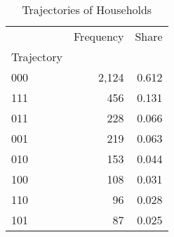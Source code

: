 \begin{table}
\centering
\caption{Trajectories of Households}
\label{tbl:trajectories}
\begin{tabular}{lrr}
\toprule
 & Frequency & Share \\
Trajectory &  &  \\
\midrule
000 & 2,124 & 0.612 \\
111 & 456 & 0.131 \\
011 & 228 & 0.066 \\
001 & 219 & 0.063 \\
010 & 153 & 0.044 \\
100 & 108 & 0.031 \\
110 & 96 & 0.028 \\
101 & 87 & 0.025 \\
\bottomrule
\end{tabular}
\end{table}
